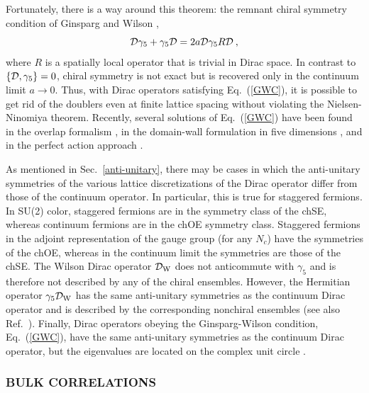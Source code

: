Fortunately, there is a way around this theorem: the remnant chiral
symmetry condition of Ginsparg and Wilson \cite{Gins82},
\begin{equation}
  \label{GWC}
  {\cal D}\gamma_5+\gamma_5{\cal D}=2a{\cal D}\gamma_5R{\cal D}\:,
\end{equation}
where $R$ is a spatially local operator that is trivial in Dirac
space.  In contrast to $\{{\cal D},\gamma_5\}=0$, chiral symmetry is
not exact but is recovered only in the continuum limit $a\to0$.  Thus,
with Dirac operators satisfying Eq.~(\ref{GWC}), it is possible to get rid of
the doublers even at finite lattice spacing without violating the
Nielsen-Ninomiya theorem.  Recently, several solutions of
Eq.~(\ref{GWC}) have been found in the overlap formalism
\cite{Neub98}, in the domain-wall formulation in five dimensions
\cite{Kapl93}, and in the perfect action approach \cite{Hase98}.

As mentioned in Sec.~\ref{anti-unitary}, there may be cases in which the
anti-unitary symmetries of the various lattice discretizations of the
Dirac operator differ from those of the continuum operator.  In
particular, this is true for staggered fermions.  In SU(2) color,
staggered fermions are in the symmetry class of the chSE, whereas
continuum fermions are in the chOE symmetry class.  Staggered fermions
in the adjoint representation of the gauge group (for any $N_c$) have
the symmetries of the chOE, whereas in the continuum limit the
symmetries are those of the chSE.  The Wilson Dirac
operator ${\cal D}_{\rm W}$ does not anticommute with $\gamma_5$ and
is therefore not described by any of the chiral ensembles.  However,
the Hermitian operator $\gamma_5{\cal D}_{\rm W}$ has the same
anti-unitary symmetries as the continuum Dirac operator and is
described by the corresponding nonchiral ensembles (see also
Ref.~\cite{Hehl}).  Finally, Dirac operators obeying the
Ginsparg-Wilson condition, Eq.~(\ref{GWC}), have the same anti-unitary
symmetries as the continuum Dirac operator, but the eigenvalues are
located on the complex unit circle \cite{Splittorff}.

\subsubsection{BULK CORRELATIONS}

